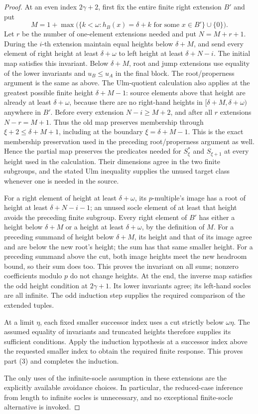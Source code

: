 \documentclass[11pt]{article}
\begin{document}
\begin{proof}
At an even index $2\gamma+2$, first fix the entire finite right
extension $B'$ and put
\[
 M=1+\max\bigl(\{k<\omega:
       h_B(x)=\delta+k\text{ for some }x\in B'\}\cup\{0\}\bigr).
\]
Let $r$ be the number of one-element extensions needed and put
$N=M+r+1$. During the $i$-th extension maintain equal heights
below $\delta+M$, and send every element of right height at least
$\delta+\omega$ to left height at least $\delta+N-i$.
The initial map satisfies this invariant. Below $\delta+M$,
root and jump extensions use equality of the lower invariants and
$u_B\le u_A$ in the final block. The root/properness argument is
the same as above. The Ulm-quotient calculation also applies at
the greatest possible finite height $\delta+M-1$: source elements
above that height are already at least $\delta+\omega$, because
there are no right-hand heights in
$[\delta+M,\delta+\omega)$ anywhere in $B'$.
Before every extension $N-i\ge M+2$, and after all $r$ extensions
$N-r=M+1$. Thus the old map preserves membership through
$\xi+2\le\delta+M+1$, including at the boundary
$\xi=\delta+M-1$. This is the exact membership preservation
used in the preceding root/properness argument as well.
Hence the partial map preserves the predicates needed
for $S_\xi^*$ and $S_{\xi+1}$ at every height used in the calculation.
Their dimensions agree in the two finite subgroups, and the stated
Ulm inequality supplies the unused target class whenever one is
needed in the source.

For a right element of height
at least $\delta+\omega$, its $p$-multiple's image has a root
of height at least $\delta+N-i-1$; an unused socle element of at
least that height avoids the preceding finite subgroup. Every right
element of $B'$ has either a height below $\delta+M$ or a height
at least $\delta+\omega$, by the definition of $M$.
For a preceding summand of height below $\delta+M$, its height
and that of its image agree and are below the new root's height;
the sum has that same smaller height. For a preceding summand
above the cut, both image heights meet the new headroom bound,
so their sum does too. This proves the invariant on all sums;
nonzero coefficients modulo $p$ do not change heights. At the end,
the inverse map satisfies the odd
height condition at $2\gamma+1$. Its lower invariants agree;
its left-hand socles are all infinite. The odd induction step
supplies the required comparison of the extended tuples.

At a limit $\eta$, each fixed smaller successor index uses a cut
strictly below $\omega\eta$. The assumed equality of invariants
and truncated heights therefore supplies its sufficient conditions.
Apply the induction hypothesis at a successor index above the
requested smaller index to obtain the required finite response.
This proves part (3) and completes the induction.

The only uses of the infinite-socle assumption in these extensions
are the explicitly available avoidance choices. In particular, the
reduced-case inference from length to infinite socles is unnecessary,
and no exceptional finite-socle alternative is invoked.
\end{proof}
\end{document}
